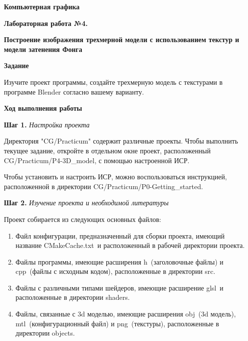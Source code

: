 \documentclass[a4paper,12pt]{article}
\begin{document}
\fontsize{14pt}{16pt}\selectfont
\begin{center}
    \textbf{{\Large Компьютерная графика}}
    
    \textbf{{\large Лабораторная работа №4. }}
    
    \textbf{{\large Построение изображения трехмерной модели с использованием текстур и модели затенения Фонга}}
    \end{center}
    
    
    \textbf{Задание}
    
    Изучите проект программы, создайте трехмерную модель с текстурами в программе Blender согласно вашему варианту.
        
    \textbf{Ход выполнения работы}
    
    \textbf{Шаг 1.} \textit{Настройка проекта}
    
    Директория "CG/Practicum" содержит различные проекты. Чтобы выполнить текущее задание, откройте в отдельном окне проект, расположенный \textquotedbl CG/Practicum/P4-3D\_model\textquotedbl, с помощью настроенной ИСР.

    Чтобы установить и настроить ИСР, можно воспользоваться инструкцией, расположенной в директории 
    \textquotedbl CG/Practicum/P0-Getting\_started\textquotedbl .
    
    \textbf{Шаг 2.} \textit{Изучение проекта и необходимой литературы}
    
    Проект собирается из следующих основных файлов:
    
    \begin{enumerate}
        \item Файл конфигурации, предназначенный для сборки проекта, имеющий название \textquotedbl CMakeCache.txt\textquotedbl~и расположенный в рабочей директории проекта.
        \item Файлы программы, имеющие расширения \textquotedbl h\textquotedbl~(заголовочные файлы) и \textquotedbl cpp\textquotedbl~(файлы с исходным кодом), расположенные в директории \textquotedbl src\textquotedbl.
        \item Файлы с различными типами шейдеров, имеющие расширение \textquotedbl glsl\textquotedbl~и расположенные в директории \textquotedbl shaders\textquotedbl.
        \item Файлы, связанные с 3d моделью, имеющие расширения \textquotedbl obj\textquotedbl~(3d модель),  \textquotedbl mtl\textquotedbl~(конфигурационный файл) и \textquotedbl png\textquotedbl~(текстуры), расположенные в директории \textquotedbl objects\textquotedbl.
    \end{enumerate}
    
\end{document}
